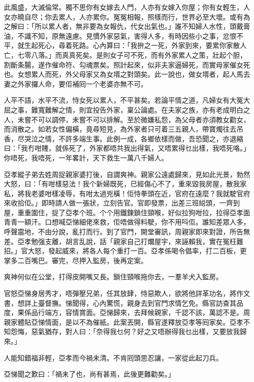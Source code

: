 \documentclass[a5paper, 12pt, openany]{book} %
\begin{document}
	此風盛，大滅倫常。獨不思你有女嫁去人門，人亦有女嫁入你屋；你有女輕生，人女亦曉自尽；你去累人，人亦累你。冤冤相報，照樣而行，世界必至大壞。或有為之解曰：「所以累人者，無非要為女報仇，代女出氣也。」誰不知婦人水性，頭戴膏油，不識不知，原無遠慮。見慣外家惡氣，害得人多，有時因些小之事，忿恨不平，就生起死心，尋着死路。心內算曰：「我拚之一死，外家到來，要累你家散人亡，七零八落。」而真真死矣。是則女子可不死，而有外家累人之策，壯起个胆，割斷条腸，遂作催命符、勾魂票矣。照計起來，似非夫家逼婦死，而實母家催女死也。女想累人而死，外父母家又為女壻之對頭矣。此一說也，做女壻者，起人馬去妻之外家攞人命，要佢補囘一个老婆亦無不可。

	人平不語，水平不流，恃女死以累人，不平甚矣。若論平情之道，凡婦女有大冤大屈之事，難寬難解之情，則宜投告外家，稟公論處。在夫家之族，亦有老成明白之人，未嘗不可以調停，未嘗不可以排解。至於微嫌私怨，為父母者亦須教女勸女，而消散之。如若女性偏橫，竟尋短見，為外家者只可着三五親人，帶寶燭往去吊香，尽哭泣之情，不許多端生事。此例一成，各鄉依樣而做，吾恐聞之，亦退縮曰：「我冇咁賤，就係死了，外家都唔共我出得氣，又唔累得乜出樣，我唔死咯。」你唔死，我唔死，一年畧計，天下救生一萬八千婦人。

	亞孝縱子弟去姓周捉親家婆打後，自謂爽神。親家公遠處歸來，見如此光景，勃然大怒，曰：「有咁樣惡法！我个新婦既死，已經傷心不了，重來毀我房屋，散我家私，將我老婆咁樣凌辱，有咁太過兇橫！佢恃拳頭在近，官府在遠麼？我就駛官府來收拾佢。」即時請人做一張狀，立刻告官。官即發票，出差三班縂頭，一齊到屋，重重圍住，捉了亞孝个班。个个用鐵鍊鎖住頸喉，好似拉狗咁拉，拉得亞孝面青青一額汗。口想喊亞悌細佬來救，佢唔做得料駛，你不用呌佢。誰知差眾人多，呼聲震地，不由分說，亂打而行。到了官門，開堂審訊，周親家即來對證，所告無差。亞孝勉强支離，胡言乱說，話「親家自己打爛屋宇，來誣賴我，實在冤枉難招。」官大怒，發起威來，將各人每个重打一百。亞孝係喝令倡率，打二百板，更掌多二百嘴巴。審完，尽押入監房，後再定案。

	爽神何似在公堂，打得皮開嘴又長。鎖住頸喉拖你去，一羣羊犬入監房。

	官怒亞悌身居秀才，唔彈壓兄弟，任其放肆，恃惡欺人，欲將他詳革功名，將作文書，想詳上臺督撫。悌聞得，心內驚慌，親身去到官門求情乞免。縣官訪查其品度，果係品行端方，容情賞面。亞悌歸來，去拜候親家，千認不該，萬認不是。周親家體貼亞悌情面，是以不為催紙。此案丟開，縣官遂釋放亞孝等囘家矣。亞孝不知怨悔，惡氣猶存，對人曰：「奈得我乜何？好之又唔辦得我乜出樣，又要放我歸來。」

	人能知錯福非輕，亞孝而今禍未清。不肯囘頭思忍讓，一家從此起刀兵。

	亞悌聞之歎曰：「禍未了也，尚有甚焉，此後更難勸矣。」
\end{document}

